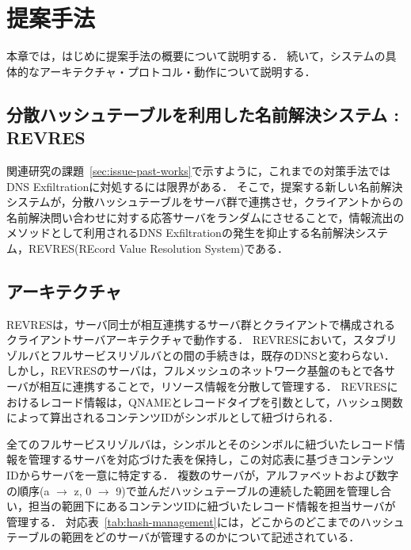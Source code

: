 \section{提案手法}
本章では，はじめに提案手法の概要について説明する．
続いて，システムの具体的なアーキテクチャ・プロトコル・動作について説明する．

\subsection{分散ハッシュテーブルを利用した名前解決システム : REVRES}
関連研究の課題~\ref{sec:issue-past-works}で示すように，これまでの対策手法ではDNS Exfiltrationに対処するには限界がある．
そこで，提案する新しい名前解決システムが，分散ハッシュテーブルをサーバ群で連携させ，クライアントからの名前解決問い合わせに対する応答サーバをランダムにさせることで，情報流出のメソッドとして利用されるDNS Exfiltrationの発生を抑止する名前解決システム，REVRES(REcord Value Resolution System)である．

\subsection{アーキテクチャ}
REVRESは，サーバ同士が相互連携するサーバ群とクライアントで構成されるクライアントサーバアーキテクチャで動作する．
REVRESにおいて，スタブリゾルバとフルサービスリゾルバとの間の手続きは，既存のDNSと変わらない．
しかし，REVRESのサーバは，フルメッシュのネットワーク基盤のもとで各サーバが相互に連携することで，リソース情報を分散して管理する．
REVRESにおけるレコード情報は，QNAMEとレコードタイプを引数として，ハッシュ関数によって算出されるコンテンツIDがシンボルとして紐づけられる．

全てのフルサービスリゾルバは，シンボルとそのシンボルに紐づいたレコード情報を管理するサーバを対応づけた表を保持し，この対応表に基づきコンテンツIDからサーバを一意に特定する．
複数のサーバが，アルファベットおよび数字の順序(a $\rightarrow$ z, 0 $\rightarrow$ 9)で並んだハッシュテーブルの連続した範囲を管理し合い，担当の範囲下にあるコンテンツIDに紐づいたレコード情報を担当サーバが管理する．
対応表~\ref{tab:hash-management}には，どこからのどこまでのハッシュテーブルの範囲をどのサーバが管理するのかについて記述されている．

